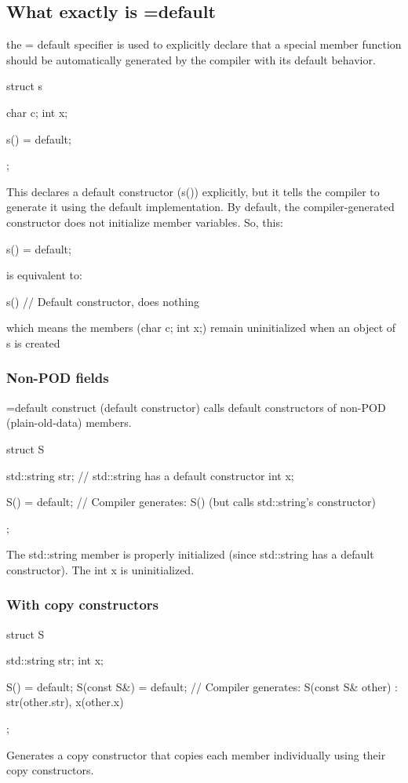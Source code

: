 \documentclass{report}
\begin{document}
    \bigbreak \noindent 
    \subsection{What exactly is =default}
    \bigbreak \noindent 
    the = default specifier is used to explicitly declare that a special member function should be automatically generated by the compiler with its default behavior.
    \bigbreak \noindent 
    \begin{cppcode}
        struct s {
            char c; 
            int x; 

            s() = default;
        };
    \end{cppcode}
    \bigbreak \noindent 
    This declares a default constructor (s()) explicitly, but it tells the compiler to generate it using the default implementation.
    \bigbreak \noindent 
    By default, the compiler-generated constructor does not initialize member variables. So, this:
    \bigbreak \noindent 
    \begin{cppcode}
    s() = default;
    \end{cppcode}
    \bigbreak \noindent 
    is equivalent to:
    \bigbreak \noindent 
    \begin{cppcode}
    s() {}  // Default constructor, does nothing
    \end{cppcode}
    \bigbreak \noindent 
    which means the members (char c; int x;) remain uninitialized when an object of s is created
    \bigbreak \noindent 
    \subsubsection{Non-POD fields}
    \bigbreak \noindent 
    =default construct (default constructor) calls default constructors of non-POD (plain-old-data) members.
    \bigbreak \noindent 
    \begin{cppcode}
        struct S {
            std::string str; // std::string has a default constructor
            int x;

            S() = default; // Compiler generates: S() {} (but calls std::string's constructor)
        };
    \end{cppcode}
    \bigbreak \noindent 
    The std::string member is properly initialized (since std::string has a default constructor). The int x is uninitialized.

    \bigbreak \noindent 
    \subsubsection{With copy constructors}
    \bigbreak \noindent 
    \begin{cppcode}
        struct S {
            std::string str;
            int x;

            S() = default;
            S(const S&) = default;  // Compiler generates: S(const S& other) : str(other.str), x(other.x) {}
        };
    \end{cppcode}
    \bigbreak \noindent 
    Generates a copy constructor that copies each member individually using their copy constructors.
\end{document}
